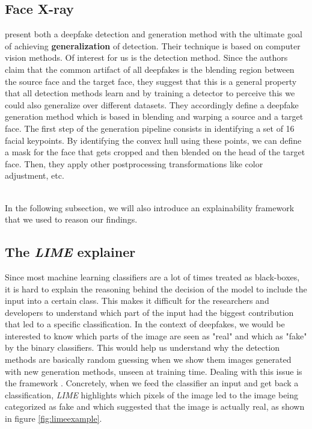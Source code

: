 \documentclass[11pt]{article}
\begin{document}
\subsection*{Face X-ray}
\cite{li2020face} present both a deepfake detection and generation method with the ultimate goal of achieving \textbf{generalization} of detection. Their technique is based on computer vision methods. Of interest for us is the detection method. Since the authors claim that the common artifact of all deepfakes is the blending region between the source face and the target face, they suggest that this is a general property that all detection methods learn and by training a detector to perceive this we could also generalize over different datasets. They accordingly define a deepfake generation method which is based in blending and warping a source and a target face. The first step of the generation pipeline consists in identifying a set of 16 facial keypoints. By identifying the convex hull using these points, we can define a mask for the face that gets cropped and then blended on the head of the target face. Then, they apply other postprocessing transformations like color adjustment, etc. 


\\
In the following subsection, we will also introduce an explainability framework that we used to reason our findings. 

\subsection*{The \textit{LIME} explainer}
Since most machine learning classifiers are a lot of times treated as black-boxes, it is hard to explain the reasoning behind the decision of the model to include the input into a certain class. This makes it difficult for the researchers and developers to understand which part of the input had the biggest contribution that led to a specific classification. In the context of deepfakes, we would be interested to know which parts of the image are seen as "real" and which as "fake" by the binary classifiers. This would help us understand why the detection methods are basically random guessing when we show them images generated with new generation methods, unseen at training time. Dealing with this issue is the  framework \cite{lime}. Concretely, when we feed the classifier an input and get back a classification, \textit{LIME} highlights which pixels of the image led to the image being categorized as fake and which suggested that the image is actually real, as shown in figure \ref{fig:limeexample}. 
\end{document}
